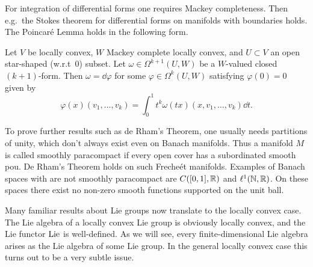 For integration of differential forms one requires Mackey completeness. Then e.g.\ the Stokes theorem for differential forms on manifolds with boundaries holds. The Poincar\'e Lemma holds in the following form.

\begin{lem}
    Let $V$ be locally convex, $W$ Mackey complete locally convex, and $U\subset V$ an open star-shaped (w.r.t\ $0$) subset. Let $\omega\in \Omega^{k+1}(U,W)$ be a $W$-valued closed $(k+1)$-form. Then $\omega=\dd \varphi$ for some $\varphi\in \Omega^k(U,W)$ satisfying $\varphi(0)=0$ given by
    \[\varphi(x)(v_1,\ldots,v_k)=\int_0^1 t^k\omega(tx)(x,v_1,\ldots,v_k)\dd t.\]
\end{lem}

To prove further results such as de Rham's Theorem, one usually needs partitions of unity, which don't always exist even on Banach manifolds. Thus a manifold $M$ is called smoothly paracompact if every open cover has a subordinated smooth \gls{pou}. De Rham's Theorem holds on such Freche\'et manifolds. Examples of Banach spaces with are not smoothly paracompact are $C([0,1],\mathbb{R})$ and $\ell^1(\mathbb{N},\mathbb{R})$. On these spaces there exist no non-zero smooth functions supported on the unit ball.


Many familiar results about Lie groups now translate to the locally convex case. The Lie algebra of a locally convex Lie group is obviously locally convex, and the Lie functor $\operatorname{Lie}$ is well-defined. As we will see, every finite-dimensional Lie algebra arises as the Lie algebra of some Lie group. In the general locally convex case this turns out to be a very subtle issue.

